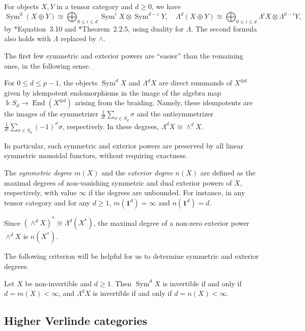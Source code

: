 \documentclass[11pt,oneside]{amsart}
\theoremstyle{definition}
\theoremstyle{remark}
\numberwithin{equation}{section}
\newcommand\End{\operatorname{End}}
\newcommand\Sym{\operatorname{Sym}}
\renewcommand\o\otimes
\renewcommand\:\colon
\newcommand\one{\mathbf{1}}
\newcommand\kk{\Bbbk}
\begin{document}
For objects $X,Y$ in a tensor category and $d\ge0$, we have
\begin{equation}
\Sym^d (X\oplus Y)\cong \bigoplus_{0\le i\le d} \Sym^i X \o \Sym^{d-i} Y  , \quad
\Lambda^d (X\oplus Y)\cong \bigoplus_{0\le i\le d} \Lambda^i X \o \Lambda^{d-i} Y ,
\label{eq:direct-sums}
\end{equation}
by \cite{CEO-incompressible}*{Equation~3.10} and \cite{CEN}*{Theorem~2.2.5}, using duality for $\Lambda$. The second formula also holds with $\Lambda$ replaced by $\wedge$.

The first few symmetric and exterior powers are ``easier'' than the remaining ones, in the following sense.

\begin{lemma} For $0\le d\le p-1$, the objects $\Sym^d X$ and $\Lambda^d X$ are direct summands of $X^{\o d}$ given by idempotent endomorphisms in the image of the algebra map $\kk S_d\to\End(X^{\o d})$ arising from the braiding. Namely, these idempotents are the images of the symmetrizer $\frac{1}{d!}\sum_{\sigma\in S_d}\sigma$ and the antisymmetrizer $\frac{1}{d!}\sum_{\sigma\in S_d}(-1)^\sigma \sigma$, respectively. In these degrees, $\Lambda^d X\cong\wedge^d X$.
\end{lemma}

In particular, such symmetric and exterior powers are preserved by all linear symmetric monoidal functors, without requiring exactness.

\medskip

The \emph{symmetric degree} $m(X)$ and the \emph{exterior degree} $n(X)$ are defined as the maximal degrees of non-vanishing symmetric and dual exterior powers of $X$, respectively, with value $\infty$ if the degrees are unbounded. For instance, in any tensor category and for any $d\ge1$, $m(\one^d)=\infty$ and $n(\one^d)=d$.

Since $(\wedge^d X)^*\cong\Lambda^d(X^*)$, the maximal degree of a non-zero exterior power $\wedge^d X$ is $n(X^*)$.

The following criterion will be helpful for us to determine symmetric and exterior degrees.

\begin{lemma} \label{lem:invertible} Let $X$ be non-invertible and $d\geq1$. Then $\Sym^d X$ is invertible if and only if $d=m(X)<\infty$, and $\Lambda^d X$ is invertible if and only if $d=n(X)<\infty$.
\end{lemma}


\subsection{Higher Verlinde categories} \label{bg:ver}
\end{document}
